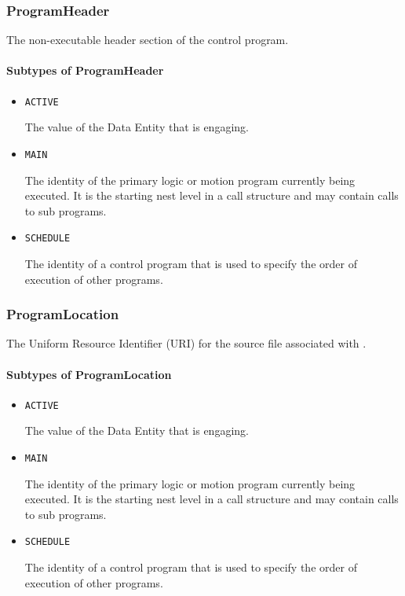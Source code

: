 \subsubsection{ProgramHeader}
\label{sec:ProgramHeader}



The non-executable header section of the control program.


\paragraph{Subtypes of ProgramHeader}\mbox{}
\label{sec:Subtypes of ProgramHeader}

\begin{itemize}

\item \texttt{ACTIVE}


The value of the \gls{Data Entity} that is engaging.

\item \texttt{MAIN}


The identity of the primary logic or motion program currently being executed. It is the starting nest level in a call structure and may contain calls to sub programs.

\item \texttt{SCHEDULE}


The identity of a control program that is used to specify the order of execution of other programs.


\end{itemize}

\subsubsection{ProgramLocation}
\label{sec:ProgramLocation}



The Uniform Resource Identifier (URI) for the source file associated with .


\paragraph{Subtypes of ProgramLocation}\mbox{}
\label{sec:Subtypes of ProgramLocation}

\begin{itemize}

\item \texttt{ACTIVE}


The value of the \gls{Data Entity} that is engaging.

\item \texttt{MAIN}


The identity of the primary logic or motion program currently being executed. It is the starting nest level in a call structure and may contain calls to sub programs.

\item \texttt{SCHEDULE}


The identity of a control program that is used to specify the order of execution of other programs.


\end{itemize}

